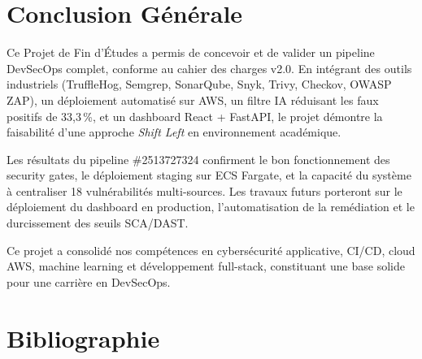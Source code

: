 \documentclass[12pt,a4paper]{report}
\begin{document}
\chapter*{Conclusion Générale}

Ce Projet de Fin d'Études a permis de concevoir et de valider un pipeline DevSecOps complet, conforme au cahier des charges v2.0. En intégrant des outils industriels (TruffleHog, Semgrep, SonarQube, Snyk, Trivy, Checkov, OWASP ZAP), un déploiement automatisé sur AWS, un filtre IA réduisant les faux positifs de 33,3\,\%, et un dashboard React + FastAPI, le projet démontre la faisabilité d'une approche \textit{Shift Left} en environnement académique.

Les résultats du pipeline \#2513727324 confirment le bon fonctionnement des security gates, le déploiement staging sur ECS Fargate, et la capacité du système à centraliser 18 vulnérabilités multi-sources. Les travaux futurs porteront sur le déploiement du dashboard en production, l'automatisation de la remédiation et le durcissement des seuils SCA/DAST.

Ce projet a consolidé nos compétences en cybersécurité applicative, CI/CD, cloud AWS, machine learning et développement full-stack, constituant une base solide pour une carrière en DevSecOps.

\chapter*{Bibliographie}
\end{document}
